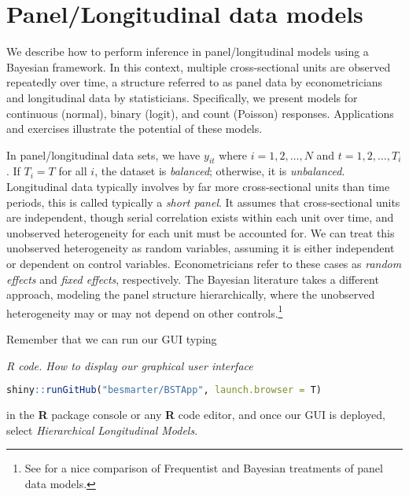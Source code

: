 \chapter{Panel/Longitudinal data models}\label{chap9}

We describe how to perform inference in panel/longitudinal models using a Bayesian framework. In this context, multiple cross-sectional units are observed repeatedly over time, a structure referred to as panel data by econometricians and longitudinal data by statisticians. Specifically, we present models for continuous (normal), binary (logit), and count (Poisson) responses. Applications and exercises illustrate the potential of these models.

In panel/longitudinal data sets, we have $y_{it}$ where $i=1,2,\dots,N$ and $t=1,2,\dots,T_i$. If $T_i=T$ for all $i$, the dataset is \textit{balanced}; otherwise, it is \textit{unbalanced}. Longitudinal data typically involves by far more cross-sectional units than time periods, this is called typically a \textit{short panel}. It assumes that cross-sectional units are independent, though serial correlation exists within each unit over time, and unobserved heterogeneity for each unit must be accounted for. We can treat this unobserved heterogeneity as random variables, assuming it is either independent or dependent on control variables. Econometricians refer to these cases as \textit{random effects} and \textit{fixed effects}, respectively. The Bayesian literature takes a different approach, modeling the panel structure hierarchically, where the unobserved heterogeneity may or may not depend on other controls.\footnote{See \cite{rendon2013fixed} for a nice comparison of Frequentist and Bayesian treatments of panel data models.}

Remember that we can run our GUI typing

\begin{tcolorbox}[enhanced,width=4.67in,center upper,
	fontupper=\large\bfseries,drop shadow southwest,sharp corners]
	\textit{R code. How to display our graphical user interface}
	\begin{VF}
		\begin{lstlisting}[language=R]
		shiny::runGitHub("besmarter/BSTApp", launch.browser = T)\end{lstlisting}
	\end{VF}
\end{tcolorbox} 

in the \textbf{R} package console or any \textbf{R} code editor, and once our GUI is deployed, select \textit{Hierarchical Longitudinal Models}.



